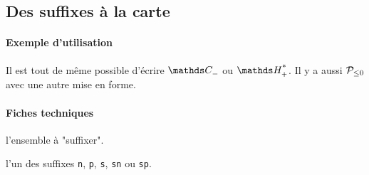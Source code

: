 \documentclass[12pt,a4paper]{article}
\begin{document}
\subsection{Des suffixes à la carte}

\paragraph{Exemple d'utilisation}

\begin{tcblisting}{}
Il est tout de même possible d'écrire $\setspecial{\CC}{n}$ ou $\setspecial{\HH}{sp}$.
Il y a aussi $\setspecial*{\setproba{P}}{n}$ avec une autre mise en forme.
\end{tcblisting}


\paragraph{Fiches techniques}



 l'ensemble à "suffixer".

 l'un des suffixes \verb+n+, \verb+p+, \verb+s+, \verb+sn+ ou \verb+sp+.
\end{document}
